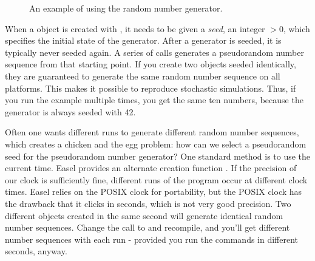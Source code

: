 \begin{figure}

\caption{An example of using the random number generator.}
\label{fig:random_example}
\end{figure}

When a  object is created with
, it needs to be given a \emph{seed},
an integer $> 0$, which specifies the initial state of the
generator. After a generator is seeded, it is typically never seeded
again. A series of  calls generates a
pseudorandom number sequence from that starting point. If you create
two  objects seeded identically, they are
guaranteed to generate the same random number sequence on all
platforms. This makes it possible to reproduce stochastic simulations.
Thus, if you run the example multiple times, you get the same ten
numbers, because the generator is always seeded with 42.

Often one wants different runs to generate different random number
sequences, which creates a chicken and the egg problem: how can we
select a pseudorandom seed for the pseudorandom number generator? One
standard method is to use the current time. Easel provides an
alternate creation function
. If the precision of our
clock is sufficiently fine, different runs of the program occur at
different clock times. Easel relies on the POSIX clock for
portability, but the POSIX clock has the drawback that it clicks in
seconds, which is not very good precision. Two different
 objects created in the same second will
generate identical random number sequences. Change the
 call to
 and recompile, and you'll
get different number sequences with each run - provided you run the
commands in different seconds, anyway.

